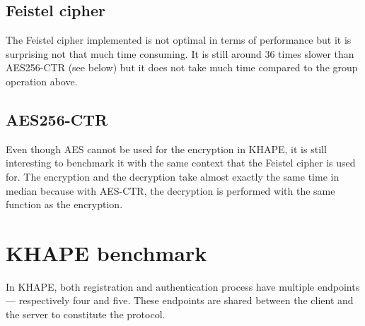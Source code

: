 \documentclass[../report.tex]{subfiles}
\begin{document}
\pgfplotsset{width=\textwidth-0.1cm}
\pgfplotsset{height=6cm}


\subsection*{Feistel cipher}
The Feistel cipher implemented is not optimal in terms of performance but it is surprising not that much time consuming.
It is still around 36 times slower than AES256-CTR (see below) but it does not take much time compared to the group operation above.




\subsection*{AES256-CTR}
Even though AES cannot be used for the encryption in KHAPE, it is still interesting to benchmark it with the same context that the Feistel cipher is used for.
The encryption and the decryption take almost exactly the same time in median because with AES-CTR, the decryption is performed with the same function as the encryption.




\section{KHAPE benchmark} %
In KHAPE, both registration and authentication process have multiple endpoints --- respectively four and five. These endpoints are shared between the client and the server to constitute the protocol.
\end{document}
